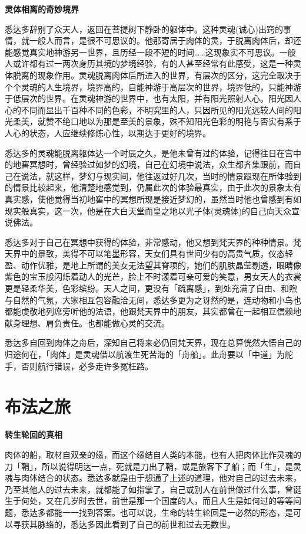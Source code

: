 \documentclass[twoside,openany]{book}
\newcommand{\mt}[1]{\textbullet \textbf{#1}}
\begin{document}
\mt{灵体相离的奇妙境界}

悉达多辞别了众天人，返回在菩提树下静卧的躯体中。这种灵魂(诚心)出窍的事情，就一般人而言，是很不可思议的。他那寄居于肉体的灵，于脱离肉体后，却还能感觉真实地神游另一世界，且历经一段不短的时间……这现象实不可思议。一般人或许都有过一两次身历其境的梦境经验，有的人甚至经常有此感受，这是一种灵体脱离的现象作用。灵魂脱离肉体后所进入的世界，有层次的区分，这完全取决于个个灵魂的人生境界，境界高的，自能神游于高层次的世界，境界低的，只能神游于低层次的世界。在灵魂神游的世界中，也有太阳，并有阳光照射人心。阳光因人心的不同而显出千百种不同的色彩，不明究里的人，只因所见的阳光远较人间的阳光柔美，就赞不绝口地以为那是至美的景象，殊不知阳光色彩的明艳与否实有系于人心的状态，人应继续修炼心性，以期达于更好的境界。

悉达多的灵魂能脱离躯体达一个时辰之久，是他未曾有过的体验，记得往日在宫中的地窖冥想时，曾经验过如梦的幻境，自己在幻境中说法，众生都齐集跟前，而自己在说法，就这样，梦幻与现实间，他往返过好几次，当时的情景跟现在所体验到的情景比较起来，他清楚地感觉到，仍属此次的体验最真实，由于此次的景象太有真实感，使他觉得当初地窖中的冥想所现是接近梦幻的，虽然当时他也曾感到有如现实般真实，这一次，他是在大白天堂而皇之地以光子体(灵魂体)的自己向天众宣说佛法。

悉达多对于自己在冥想中获得的体验，非常感动，他又想到梵天界的种种情景。梵天界中的景致，美得不可以笔墨形容，天女们具有世间少有的高贵气质，仪态轻盈、动作优雅，是地上所谓的美女无法望其脊项的，她们的肌肤晶莹剔透，眼睛像紫色的宝玉般闪烁着动人的光芒，脸上不时漾着可亲可爱的笑意，男女天人的衣裳更是轻柔华美，色彩缤纷。天人之间，更没有「疏离感」，到处充满了自由、和煦与自然的气氛，大家相互包容融洽无间，悉达多更为之讶然的是，连动物和小鸟也都能虔敬地列席旁听他的法语，他跟梵天界中的朋友，其实都曾在一起相互信赖地献身理想、肩负责任。也都能做心灵的交流。

悉达多自回到肉体之舟后，深知自己将来必仍回梵天界，现在总算恍然大悟自己的归途何在，「肉体」是灵魂借以航渡生死苦海的「舟船」。此舟要以「中道」为舵手，否则航行错误，必多走许多冤枉路。

\section{布法之旅}\label{sec1.19}

\mt{转生轮回的真相}

肉体的船，取材自双亲的缘，而这个缘结自人类的本能，也有人把肉体比作灵魂的刀「鞘」，所以说得明达一点，死就是刀出了鞘，或是旅客下了船；而「生」，是灵魂与肉体结合的状态。悉达多就是由于想通了上述的道理，他对自己的过去未来，乃至其他人的过去未来，就都能了如指掌了，自己或别人在前世做过什么事，曾诞生于何处，又在几岁时去世，前世是那一个国度的人，而且人生是如何过的等等问题，悉达多都能一一找到答案。也可以说，生命的转生轮回是一必然的形态，是可以寻获其脉络的，悉达多因此看到了自己的前世和过去无数世。
\end{document}
